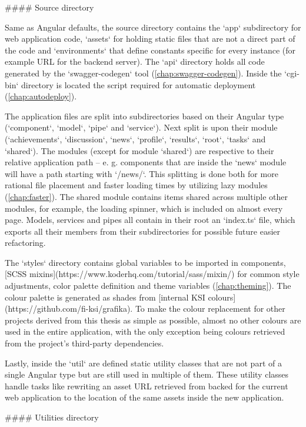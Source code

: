 \documentclass[
  digital, %
  oneside, %
  lof,     %
  nolot,     %
]{fithesis4}
\begin{document}
{#### Source directory

Same as Angular defaults, the source directory contains the `app` subdirectory for web application code, `assets` for holding static files that are not a direct part of the code and `environments` that define constants specific for every instance (for example URL for the backend server). The `api` directory holds all code generated by the `swagger-codegen` tool (\autoref{chap:swagger-codegen}). Inside the `cgi-bin` directory is located the script required for automatic deployment (\autoref{chap:autodeploy}).

The application files are split into subdirectories based on their Angular type (`component`, `model`, `pipe` and `service`). Next split is upon their module (`achievements`, `discussion`, `news`, `profile`, `results`, `root`, `tasks` and `shared`). The modules (except for module `shared`) are respective to their relative application path -- e. g. components that are inside the `news` module will have a path starting with `/news/`. This splitting is done both for more rational file placement and faster loading times by utilizing lazy modules (\autoref{chap:faster}). The shared module contains items shared across multiple other modules, for example, the loading spinner, which is included on almost every page. Models, services and pipes all contain in their root an `index.ts` file, which exports all their members from their subdirectories for possible future easier refactoring.

The `styles` directory contains global variables to be imported in components, [SCSS mixins](https://www.koderhq.com/tutorial/sass/mixin/) for common style adjustments, color palette definition and theme variables (\autoref{chap:theming}). The colour palette is generated as shades from [internal KSI colours](https://github.com/fi-ksi/grafika). To make the colour replacement for other projects derived from this thesis as simple as possible, almost no other colours are used in the entire application, with the only exception being colours retrieved from the project's third-party dependencies.

Lastly, inside the `util` are defined static utility classes that are not part of a single Angular type but are still used in multiple of them. These utility classes handle tasks like rewriting an asset URL retrieved from backed for the current web application to the location of the same assets inside the new application.

#### Utilities directory
\label{chap:utils}

}
\end{document}
